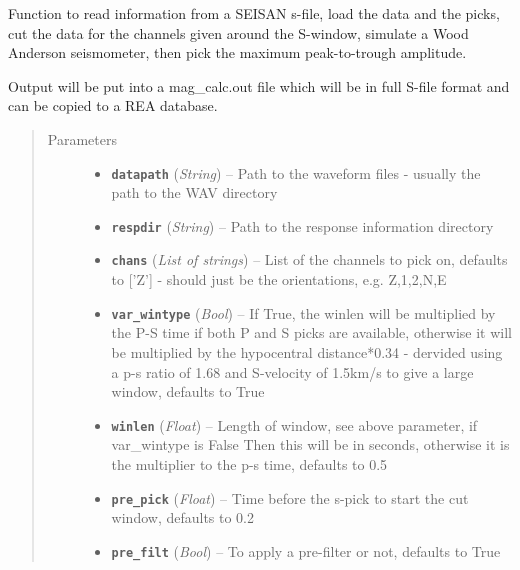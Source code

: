 \documentclass[a4paper,10pt,english]{sphinxmanual}
\begin{document}
\begin{fulllineitems}
\label{utils:mag_calc.Amp_pick_sfile}
Function to read information from a SEISAN s-file, load the data and the
picks, cut the data for the channels given around the S-window, simulate
a Wood Anderson seismometer, then pick the maximum peak-to-trough
amplitude.

Output will be put into a mag\_calc.out file which will be in full S-file
format and can be copied to a REA database.
\begin{quote}\begin{description}
\item[{Parameters}] \leavevmode\begin{itemize}
\item {} 
\textbf{\texttt{datapath}} (\emph{String}) -- Path to the waveform files - usually the path to the WAV directory

\item {} 
\textbf{\texttt{respdir}} (\emph{String}) -- Path to the response information directory

\item {} 
\textbf{\texttt{chans}} (\emph{List of strings}) -- List of the channels to pick on, defaults to {[}'Z'{]} - should
just be the orientations, e.g. Z,1,2,N,E

\item {} 
\textbf{\texttt{var\_wintype}} (\emph{Bool}) -- If True, the winlen will be
multiplied by the P-S time if both P and S picks are
available, otherwise it will be multiplied by the hypocentral
distance*0.34 - dervided using a p-s ratio of 1.68 and
S-velocity of 1.5km/s to give a large window, defaults to True

\item {} 
\textbf{\texttt{winlen}} (\emph{Float}) -- Length of window, see above parameter, if var\_wintype is False
Then this will be in seconds, otherwise it is the multiplier
to the p-s time, defaults to 0.5

\item {} 
\textbf{\texttt{pre\_pick}} (\emph{Float}) -- Time before the s-pick to start the cut window, defaults
to 0.2

\item {} 
\textbf{\texttt{pre\_filt}} (\emph{Bool}) -- To apply a pre-filter or not, defaults to True


\end{itemize}
\end{description}
\end{quote}
\end{fulllineitems}
\end{document}
